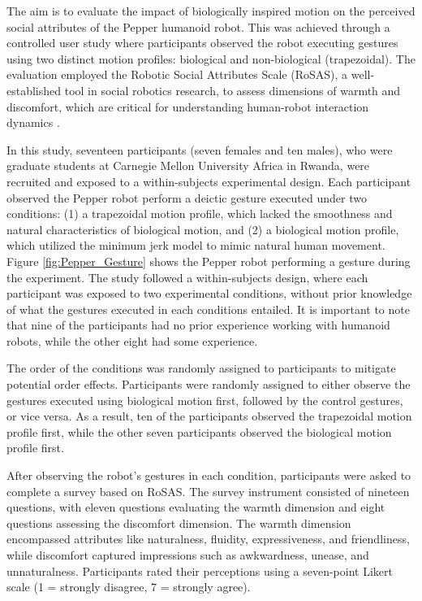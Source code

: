 \documentclass{CSSRforAfrica}
\begin{document}
The aim is to evaluate the impact of biologically inspired motion on the perceived social attributes of the Pepper humanoid robot. This was achieved through a controlled user study where participants observed the robot executing gestures using two distinct motion profiles: biological and non-biological (trapezoidal). The evaluation employed the Robotic Social Attributes Scale (RoSAS), a well-established tool in social robotics research, to assess dimensions of warmth and discomfort, which are critical for understanding human-robot interaction dynamics \cite{Carpinellaetal2017,Spatola2021,Mandletal2022,Jorgensen2021}.

In this study, seventeen participants (seven females and ten males), who were graduate students at Carnegie Mellon University Africa in Rwanda, were recruited and exposed to a within-subjects experimental design. Each participant observed the Pepper robot perform a deictic gesture executed under two conditions: (1) a trapezoidal motion profile, which lacked the smoothness and natural characteristics of biological motion, and (2) a biological motion profile, which utilized the minimum jerk model to mimic natural human movement. Figure \ref{fig:Pepper_Gesture} shows the Pepper robot performing a gesture during the experiment. The study followed a within-subjects design, where each participant was exposed to two experimental conditions, without prior knowledge of what the gestures executed in each conditions entailed. It is important to note that nine of the participants had no prior experience working with humanoid robots, while the other eight had some experience.


The order of the conditions was randomly assigned to participants to mitigate potential order effects. Participants were randomly assigned to either observe the gestures executed using biological motion first, followed by the control gestures, or vice versa. As a result, ten of the participants observed the trapezoidal motion profile first, while the other seven participants observed the biological motion profile first.

After observing the robot's gestures in each condition, participants were asked to complete a survey based on  RoSAS. The survey instrument consisted of nineteen questions, with eleven questions evaluating the warmth dimension and eight questions assessing the discomfort dimension. The warmth dimension encompassed attributes like naturalness, fluidity, expressiveness, and friendliness, while discomfort captured impressions such as awkwardness, unease, and unnaturalness. Participants rated their perceptions using a seven-point Likert scale (1 = strongly disagree, 7 = strongly agree).
\end{document}
